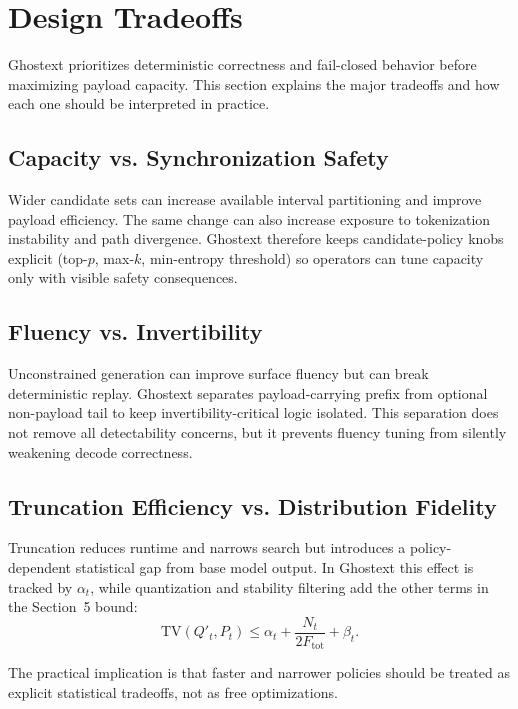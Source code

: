 \section{Design Tradeoffs}

Ghostext prioritizes deterministic correctness and fail-closed behavior before maximizing payload capacity. This section explains the major tradeoffs and how each one should be interpreted in practice.

\subsection{Capacity vs. Synchronization Safety}

Wider candidate sets can increase available interval partitioning and improve payload efficiency. The same change can also increase exposure to tokenization instability and path divergence. Ghostext therefore keeps candidate-policy knobs explicit (top-$p$, max-$k$, min-entropy threshold) so operators can tune capacity only with visible safety consequences.

\subsection{Fluency vs. Invertibility}

Unconstrained generation can improve surface fluency but can break deterministic replay. Ghostext separates payload-carrying prefix from optional non-payload tail to keep invertibility-critical logic isolated. This separation does not remove all detectability concerns, but it prevents fluency tuning from silently weakening decode correctness.

\subsection{Truncation Efficiency vs. Distribution Fidelity}

Truncation reduces runtime and narrows search but introduces a policy-dependent statistical gap from base model output. In Ghostext this effect is tracked by $\alpha_t$, while quantization and stability filtering add the other terms in the Section~5 bound:
\begin{equation}
\mathrm{TV}(Q'_t,P_t)\le\alpha_t + \frac{N_t}{2F_{\mathrm{tot}}} + \beta_t.
\end{equation}

The practical implication is that faster and narrower policies should be treated as explicit statistical tradeoffs, not as free optimizations.

